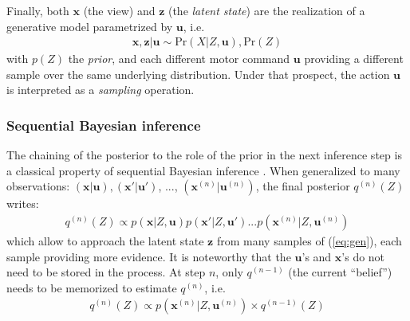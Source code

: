 \documentclass[12pt,twoside,openright]{article}
\begin{document}
%


Finally, both $\boldsymbol{x}$ (the view) and $\boldsymbol{z}$ (the \emph{latent state}) are the realization of a generative model parametrized by $\boldsymbol{u}$, i.e.
\begin{align}
\boldsymbol{x}, \boldsymbol{z} | \boldsymbol{u} \sim \text{Pr}(X|Z, \boldsymbol{u}), \text{Pr}(Z) \label{eq:generative}
\end{align}  
with $p(Z)$ the \emph{prior}, and each different motor command $\boldsymbol{u}$ providing a different sample over the same underlying distribution. Under that prospect, the action $\boldsymbol{u}$ is interpreted as a \emph{sampling} operation.

\subsubsection{Sequential Bayesian inference}\label{sec:seq-bayes}

The chaining of the posterior to the role of the prior in the next inference step is a classical property of sequential Bayesian inference \cite{wald1945sequential}.
When generalized to many observations: $(\boldsymbol{x}|\boldsymbol{u}), (\boldsymbol{x}'|\boldsymbol{u}')$, ..., $(\boldsymbol{x}^{(n)}|\boldsymbol{u}^{(n)})$, the final posterior $q^{(n)}(Z)$ writes:
\begin{align}
q^{(n)}(Z) \propto p(\boldsymbol{x}|Z,\boldsymbol{u}) p(\boldsymbol{x}'|Z,\boldsymbol{u}') ... p(\boldsymbol{x}^{(n)}|Z,\boldsymbol{u}^{(n)}) \label{eq:accum}
\end{align}
which allow to approach the latent state $\boldsymbol{z}$ from many samples of (\ref{eq:gen}), each sample providing more evidence. 
It is noteworthy that the $\boldsymbol{u}$'s and $\boldsymbol{x}$'s do not need to be stored in the process. At step $n$, only $q^{(n-1)}$ (the current ``belief'') needs to be memorized to estimate $q^{(n)}$, i.e. 
\begin{align} 
q^{(n)}(Z) \propto p(\boldsymbol{x}^{(n)}|Z,\boldsymbol{u}^{(n)}) \times q^{(n-1)}(Z) \label{eq:accum-post}
\end{align}
\end{document}

